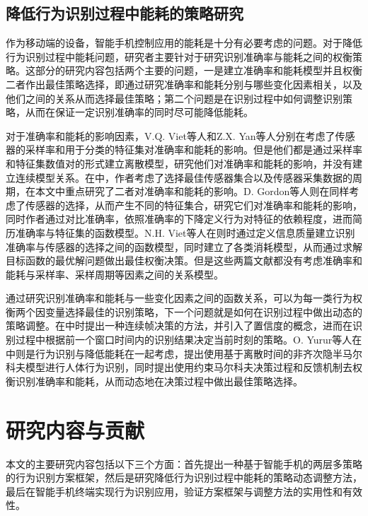 \subsection{降低行为识别过程中能耗的策略研究}
\par 作为移动端的设备，智能手机控制应用的能耗是十分有必要考虑的问题。对于降低行为识别过程中能耗问题，研究者主要针对于研究识别准确率与能耗之间的权衡策略。这部分的研究内容包括两个主要的问题，一是建立准确率和能耗模型并且权衡二者作出最佳策略选择，即通过研究准确率和能耗分别与哪些变化因素相关，以及他们之间的关系从而选择最佳策略；第二个问题是在识别过程中如何调整识别策略，从而在保证一定识别准确率的同时尽可能降低能耗。
\par 对于准确率和能耗的影响因素，V.Q. Viet等人和Z.X. Yan等人分别在\cite{fixPositionandOrientation2}\cite{modelVarialb}考虑了传感器的采样率和用于分类的特征集对准确率和能耗的影响。但是他们都是通过采样率和特征集数值对的形式建立离散模型，研究他们对准确率和能耗的影响，并没有建立连续模型关系。在\cite{sensorSet}中，作者考虑了选择最佳传感器集合以及传感器采集数据的周期，在本文中重点研究了二者对准确率和能耗的影响。D. Gordon等人则在\cite{sensorSetAndmodel}同样考虑了传感器的选择，从而产生不同的特征集合，研究它们对准确率和能耗的影响，同时作者通过对比准确率，依照准确率的下降定义行为对特征的依赖程度，进而简历准确率与特征集的函数模型。N.H. Viet等人在\cite{precionModel}则时通过定义信息质量建立识别准确率与传感器的选择之间的函数模型，同时建立了各类消耗模型，从而通过求解目标函数的最优解问题做出最佳权衡决策。但是这些两篇文献都没有考虑准确率和能耗与采样率、采样周期等因素之间的关系模型。
\par 通过研究识别准确率和能耗与一些变化因素之间的函数关系，可以为每一类行为权衡两个因变量选择最佳的识别策略，下一个问题就是如何在识别过程中做出动态的策略调整。在\cite{fixPositionandOrientation2}\cite{modelVarialb}中时提出一种连续帧决策的方法，并引入了置信度的概念，进而在识别过程中根据前一个窗口时间内的识别结果决定当前时刻的策略。O. Yurur等人在\cite{adapteStratery}中则是行为识别与降低能耗在一起考虑，提出使用基于离散时间的非齐次隐半马尔科夫模型进行人体行为识别，同时提出使用约束马尔科夫决策过程和反馈机制去权衡识别准确率和能耗，从而动态地在决策过程中做出最佳策略选择。

\section{研究内容与贡献}
\par 本文的主要研究内容包括以下三个方面：首先提出一种基于智能手机的两层多策略的行为识别方案框架，然后是研究降低行为识别过程中能耗的策略动态调整方法，最后在智能手机终端实现行为识别应用，验证方案框架与调整方法的实用性和有效性。

